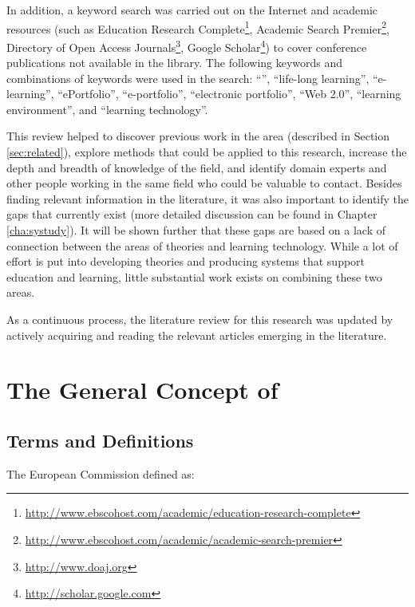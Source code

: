 In addition, a keyword search was carried out on the Internet and academic
resources (such as Education Research
Complete\footnote{\url{http://www.ebscohost.com/academic/education-research-complete}},
Academic Search
Premier\footnote{\url{http://www.ebscohost.com/academic/academic-search-premier}},
Directory of Open Access Journals\footnote{\url{http://www.doaj.org}}, Google
Scholar\footnote{\url{http://scholar.google.com}}) to cover conference
publications not available in the library. The following keywords and
combinations of keywords were used in the search: ``\LLLsn'', ``life-long
learning'', ``e-learning'', ``ePortfolio'', ``e-portfolio'', ``electronic
portfolio'', ``Web 2.0'', ``learning environment'', and ``learning technology''.

This review helped to discover previous work in the area (described in Section
\ref{sec:related}), explore methods that could be applied to this research,
increase the depth and breadth of knowledge of the field, and identify domain
experts and other people working in the same field who could be valuable to
contact. Besides finding relevant information in the literature, it was also
important to identify the gaps that currently exist (more detailed discussion
can be found in Chapter \ref{cha:systudy}). It will be shown further that these
gaps are based on a lack of connection between the areas of \LLLs theories and
learning technology. While a lot of effort is put into developing theories and producing
systems that support education and learning, little substantial work exists on
combining these two areas.

As a continuous process, the literature review for this research was updated by
actively acquiring and reading the relevant articles emerging in the literature.

\section{The General Concept of \LLLc}
\label{sec:concepts}
\subsection{Terms and Definitions}

The European Commission \citeyearpar{EuropeanCommission2000} defined \LLLs as:


